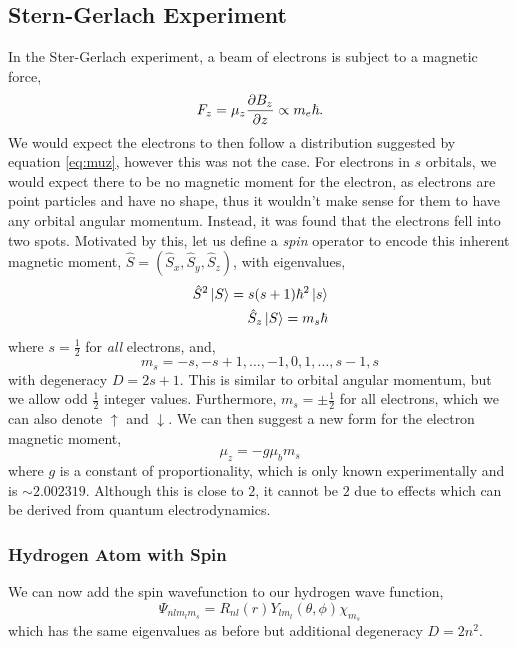 \documentclass{book}
\begin{document}
\subsection{Stern-Gerlach Experiment}
In the Ster-Gerlach experiment, a beam of electrons is subject to a magnetic force,
\begin{equation}
	F_z = \mu_z\pdv{B_z}{z} \propto m_e\hbar.
\end{equation}
We would expect the electrons to then follow a distribution suggested by equation \eqref{eq:muz}, however this was not the case. For electrons in $s$ orbitals, we would expect there to be no magnetic moment for the electron, as electrons are point particles and have no shape, thus it wouldn't make sense for them to have any orbital angular momentum. Instead, it was found that the electrons fell into two spots. Motivated by this, let us define a \textit{spin} operator to encode this inherent magnetic moment, $\hat{S} = \left(\hat{S}_x, \hat{S}_y, \hat{S}_z\right)$, with eigenvalues,
\begin{align}
	\hat{S}^2\ket{S} = s(s+1)\hbar^2\ket{s} \\
	\hat{S}_z\ket{S} = m_s\hbar
\end{align}
where $s=\frac{1}{2}$ for \textit{all} electrons, and,
\begin{equation}
	m_s = -s, -s+1,\ldots,-1,0,1,\ldots,s-1,s
\end{equation}
with degeneracy $D = 2s+1$. This is similar to orbital angular momentum, but we allow odd $\frac{1}{2}$ integer values. Furthermore, $m_s = \pm \frac{1}{2}$ for all electrons, which we can also denote $\uparrow$ and $\downarrow$. We can then suggest a new form for the electron magnetic moment,
\begin{equation}
	\mu_z = -g\mu_bm_s
\end{equation}
where $g$ is a constant of proportionality, which is only known experimentally and is $\sim2.002319$. Although this is close to $2$, it cannot be $2$ due to effects which can be derived from quantum electrodynamics.
\subsubsection{Hydrogen Atom with Spin}
We can now add the spin wavefunction to our hydrogen wave function,
\begin{equation}
	\Psi_{nlm_lm_s} = R_{nl}(r)Y_{lm_l}(\theta,\phi)\chi_{m_s}
\end{equation}
which has the same eigenvalues as before but additional degeneracy $D = 2n^2$.
\appendix
\end{document}
